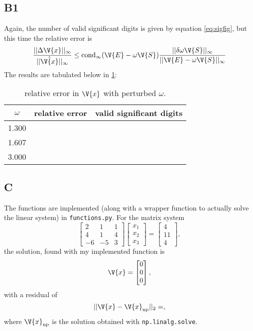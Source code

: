 \documentclass[a4paper,10pt]{article}
\begin{document}
	\subsection*{B1}
	Again, the number of valid significant digits is given by equation \ref{eq:sigfig}, but this time the relative error is
	\begin{equation}\label{key}
		\frac{||\Delta \V{x} ||_{\infty}}{||\hat{\V{x}} ||_{\infty}} \leq \text{cond}_{\infty} (\V{E} - \omega \V{S}) \frac{||\delta \omega \V{S}||_{\infty}}{||\V{E} - \omega \V{S}||_{\infty}}
	\end{equation}
	The results are tabulated below in \ref{tab:perturbed}:
	\begin{table}[H]
		\centering
		\begin{tabular}{c|c|c}
			$ \omega $ & relative error & valid significant digits \\
			\hline
			1.300 & & \\
			1.607 & & \\
			3.000 & & 
		\end{tabular}
		\caption{relative error in $ \V{x} $ with perturbed $ \omega $.}
		\label{tab:perturbed}
	\end{table}
	
	\subsection*{C}
	The functions are implemented (along with a wrapper function to actually solve the linear system) in \texttt{functions.py}. For the matrix system
	\begin{equation}\label{key}
		\begin{bmatrix}
		2 & 1 & 1 \\ 4 & 1 & 4 \\ -6 & -5 & 3
		\end{bmatrix} \begin{bmatrix}
		x_1 \\ x_2 \\ x_3
		\end{bmatrix} = \begin{bmatrix}
		4 \\ 11 \\ 4
		\end{bmatrix},
	\end{equation}
	the solution, found with my implemented function is
	\begin{equation}\label{key}
		\V{x} = \begin{bmatrix}
		0 \\ 0 \\ 0
		\end{bmatrix},
	\end{equation}
	with a residual of
	\begin{equation}\label{key}
		||\V{x} - \V{x}_{\text{np}}||_2 = ,
	\end{equation}
	where $ \V{x}_{\text{np}} $ is the solution obtained with \texttt{np.linalg.solve}.
	
\end{document}
